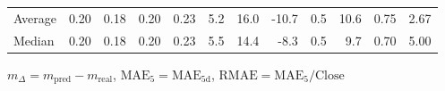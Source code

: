 \begin{threeparttable}
{\begin{tabular}{lrrrrrrrrrrr}
Average &          0.20 &          0.18 &          0.20 &        0.23 &                 5.2 &                16.0 &      -10.7 &                 0.5 &             10.6 &            0.75 &                   2.67 \\
 Median &          0.20 &          0.18 &          0.20 &        0.23 &                 5.5 &                14.4 &       -8.3 &                 0.5 &              9.7 &            0.70 &                   5.00 \\
\bottomrule
\end{tabular}
}
\begin{tablenotes}\footnotesize
\item $m_\Delta=m_{\text{pred}}-m_{\text{real}}$,
$\mathrm{MAE}_5=\mathrm{MAE}_{5\text{d}}$,
$\mathrm{RMAE}=\mathrm{MAE}_5/\text{Close}$
\end{tablenotes}
\end{threeparttable}
\endgroup

